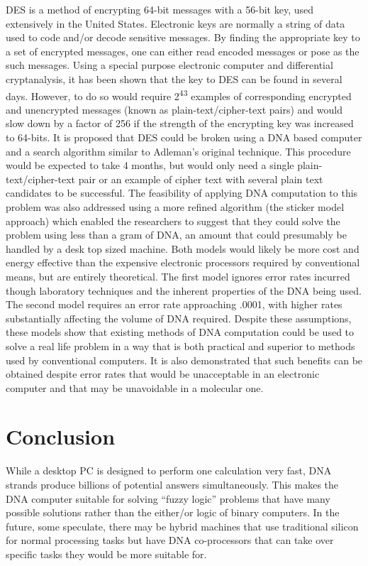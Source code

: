DES is a method of encrypting 64-bit messages with a 56-bit key, used extensively in the United States. Electronic keys are normally a string of data used to code and/or decode sensitive messages. By finding the appropriate key to a set of encrypted messages, one can either read encoded messages or pose as the such messages. Using a special purpose electronic computer and differential cryptanalysis, it has been shown that the key to DES can be found in several days. However, to do so would require 2\textsuperscript{43} examples of corresponding encrypted and unencrypted messages (known as plain-text/cipher-text pairs) and would slow down by a factor of 256 if the strength of the encrypting key was increased to 64-bits. It is proposed that DES could be broken using a DNA based computer and a search algorithm similar to Adleman's original technique. This procedure would be expected to take 4 months, but would only need a single plain-text/cipher-text pair or an example of cipher text with several plain text candidates to be successful. The feasibility of applying DNA computation to this problem was also addressed  using a more refined algorithm (the sticker model approach) which enabled the researchers to suggest that they could solve the problem using less than a gram of DNA, an amount that could presumably be handled by a desk top sized machine. Both models would likely be more cost and energy effective than the expensive electronic processors required by conventional means, but are entirely theoretical. The first model ignores error rates incurred though laboratory techniques and the inherent properties of the DNA being used. The second model requires an error rate approaching .0001, with higher rates substantially affecting the volume of DNA required. Despite these assumptions, these models show that existing methods of DNA computation could be used to solve a real life problem in a way that is both practical and superior to methods used by conventional computers. It is also demonstrated that such benefits can be obtained despite error rates that would be unacceptable in an electronic computer and that may be unavoidable in a molecular one.

\newpage
\section{Conclusion}

While  a  desktop  PC  is  designed  to  perform  one  calculation  very  fast, DNA  strands  produce  billions  of  potential  answers  simultaneously. This  makes  the  DNA  computer  suitable  for  solving  ``fuzzy  logic'' 
problems that have many possible solutions rather than the either/or logic of binary computers. In the future, some speculate, there may be hybrid  machines  that  use  traditional  silicon  for  normal  processing 
tasks  but  have  DNA  co-processors  that  can  take  over  specific  tasks they would be more suitable for. 

